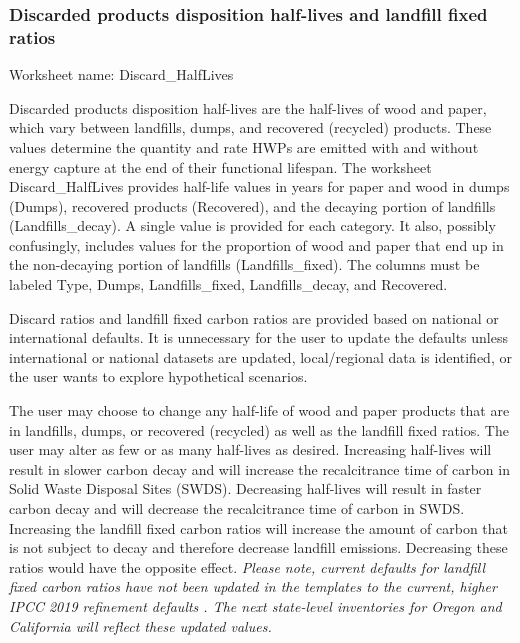 \documentclass[
  openany]{book}
\begin{document}
\hypertarget{own-prov-input-discHL}{%
\subsubsection{Discarded products disposition half-lives and landfill fixed ratios}\label{own-prov-input-discHL}}

Worksheet name: Discard\_HalfLives

Discarded products disposition half-lives are the half-lives of wood and paper, which vary between landfills, dumps, and recovered (recycled) products. These values determine the quantity and rate HWPs are emitted with and without energy capture at the end of their functional lifespan. The worksheet Discard\_HalfLives provides half-life values in years for paper and wood in dumps (Dumps), recovered products (Recovered), and the decaying portion of landfills (Landfills\_decay). A single value is provided for each category. It also, possibly confusingly, includes values for the proportion of wood and paper that end up in the non-decaying portion of landfills (Landfills\_fixed). The columns must be labeled Type, Dumps, Landfills\_fixed, Landfills\_decay, and Recovered.

Discard ratios and landfill fixed carbon ratios are provided based on national or international defaults. It is unnecessary for the user to update the defaults unless international or national datasets are updated, local/regional data is identified, or the user wants to explore hypothetical scenarios.

The user may choose to change any half-life of wood and paper products that are in landfills, dumps, or recovered (recycled) as well as the landfill fixed ratios. The user may alter as few or as many half-lives as desired. Increasing half-lives will result in slower carbon decay and will increase the recalcitrance time of carbon in Solid Waste Disposal Sites (SWDS). Decreasing half-lives will result in faster carbon decay and will decrease the recalcitrance time of carbon in SWDS. Increasing the landfill fixed carbon ratios will increase the amount of carbon that is not subject to decay and therefore decrease landfill emissions. Decreasing these ratios would have the opposite effect. \emph{Please note, current defaults for landfill fixed carbon ratios have not been updated in the templates to the current, higher IPCC 2019 refinement defaults \autocite{buendia2019}. The next state-level inventories for Oregon and California will reflect these updated values.}
\end{document}
